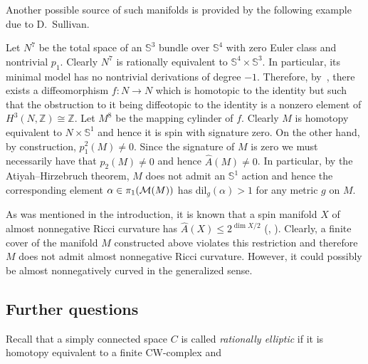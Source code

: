 \documentclass{amsart}
\begin{document}
Another possible source of such manifolds is provided by the following example due to D.~Sullivan.
\begin{ex}
Let $N^7$ be the total space of an $\mathbb{S}^3$ bundle over $\mathbb{S}^4$ with zero Euler class and nontrivial $p_1$.
Clearly $N^7$ is rationally equivalent to $\mathbb{S}^4\times \mathbb{S}^3$.
In particular, its minimal model has no nontrivial derivations of degree $-1$.
Therefore,  by~\cite[13.3]{Su}, there exists a diffeomorphism $f\colon N\to N$ which is homotopic to the identity but such that the obstruction to it being diffeotopic to the identity is a nonzero element of $H^3(N,\mathbb{Z})\cong \mathbb{Z}$.
Let $M^8$ be the mapping cylinder of $f$.
Clearly $M$ is homotopy equivalent to $N\times \mathbb{S}^{1}$ and hence it is spin with signature zero.
On the other hand, by construction, $p_1^2(M)\ne 0$.
Since the signature of $M$ is zero we must necessarily have that $p_2(M)\ne 0$  and hence $\hat{A}(M)\ne 0$.
In particular, by the Atiyah--Hirzebruch theorem, $M$ does not admit an $\mathbb{S}^{1}$ action  and hence the corresponding element $\alpha \in \pi_1({\mathcal M}(M))$ has dil$_g(\alpha)>1$ for any metric $g$ on $M$.
\end{ex}

\begin{rmk}
As was mentioned in the introduction, it is known that a spin
manifold $X$ of almost nonnegative Ricci curvature has
$\hat{A}(X)\le 2^{\dim X/2}$ (\cite[page 41]{G5}, \cite{Ga}).
Clearly, a finite cover of the manifold $M$ constructed above
violates this restriction and therefore $M$ does not admit almost
nonnegative Ricci curvature. However,  it could possibly be almost
nonnegatively curved in the generalized sense.
\end{rmk}



















\subsection{Further questions}

Recall that a simply connected space $C$ is called  \emph{rationally
elliptic} if it is homotopy equivalent to a finite CW-complex and
\end{document}
